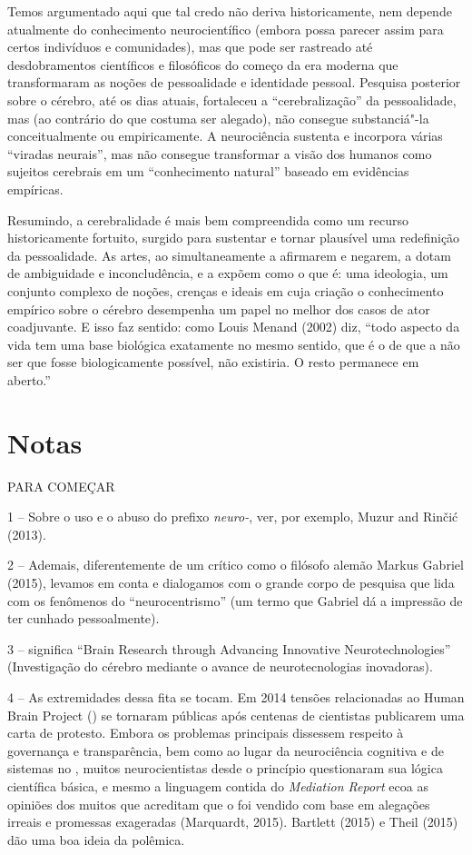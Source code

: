 Temos argumentado aqui que tal credo não deriva historicamente, nem
depende atualmente do conhecimento neurocientífico (embora possa parecer
assim para certos indivíduos e comunidades), mas que pode ser rastreado
até desdobramentos científicos e filosóficos do começo da era moderna
que transformaram as noções de pessoalidade e identidade pessoal.
Pesquisa posterior sobre o cérebro, até os dias atuais, fortaleceu a
``cerebralização'' da pessoalidade, mas (ao contrário do que costuma ser
alegado), não consegue substanciá"-la conceitualmente ou empiricamente. A
neurociência sustenta e incorpora várias ``viradas neurais'', mas não
consegue transformar a visão dos humanos como sujeitos cerebrais em um
``conhecimento natural'' baseado em evidências empíricas.

Resumindo, a cerebralidade é mais bem compreendida como um recurso
historicamente fortuito, surgido para sustentar e tornar plausível uma
redefinição da pessoalidade. As artes, ao simultaneamente a afirmarem e
negarem, a dotam de ambiguidade e inconcludência, e a expõem como o que
é: uma ideologia, um conjunto complexo de noções, crenças e ideais em
cuja criação o conhecimento empírico sobre o cérebro desempenha um papel
no melhor dos casos de ator coadjuvante. E isso faz sentido: como Louis
Menand (2002) diz, ``todo aspecto da vida tem uma base biológica
exatamente no mesmo sentido, que é o de que a não ser que fosse
biologicamente possível, não existiria. O resto permanece em aberto.''

\chapter{Notas}

PARA COMEÇAR

1 -- Sobre o uso e o abuso do prefixo \emph{neuro-}, ver, por exemplo,
Muzur and Rinčić (2013).

2 -- Ademais, diferentemente de um crítico como o filósofo alemão Markus
Gabriel (2015), levamos em conta e dialogamos com o grande corpo de
pesquisa que lida com os fenômenos do ``neurocentrismo'' (um termo que
Gabriel dá a impressão de ter cunhado pessoalmente).

3 --  significa ``Brain Research through Advancing Innovative
Neurotechnologies'' (Investigação do cérebro mediante o avance de
neurotecnologias inovadoras).

4 -- As extremidades dessa fita se tocam. Em 2014 tensões relacionadas
ao Human Brain Project () se tornaram públicas após centenas de
cientistas publicarem uma carta de protesto. Embora os problemas
principais dissessem respeito à governança e transparência, bem como ao
lugar da neurociência cognitiva e de sistemas no , muitos
neurocientistas desde o princípio questionaram sua lógica científica
básica, e mesmo a linguagem contida do \emph{Mediation Report} ecoa as
opiniões dos muitos que acreditam que o  foi vendido com base em
alegações irreais e promessas exageradas (Marquardt, 2015). Bartlett
(2015) e Theil (2015) dão uma boa ideia da polêmica.

